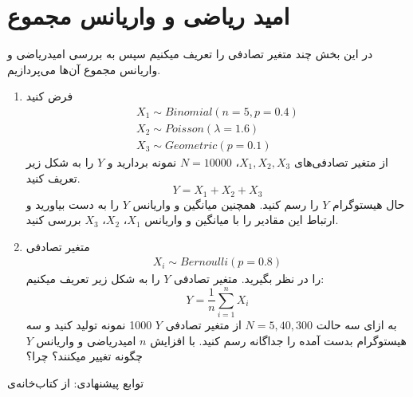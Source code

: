 \documentclass[a4paper]{article}
\begin{document}
\section{امید ریاضی و واریانس مجموع}
در این بخش چند متغیر تصادفی را تعریف میکنیم سپس به بررسی امیدریاضی و واریانس مجموع آن‌ها می‌پردازیم.
\begin{enumerate}
	\item

فرض کنید
\begin{gather*}
	X_{1} \sim Binomial(n=5,p=0.4) 
	\\
	X_{2} \sim Poisson(\lambda=1.6)
	\\
	X_{3} \sim Geometric(p=0.1)
\end{gather*}
از متغیر تصادفی‌های 
$ 	X_{1},X_{2},X_{3} $،
$ N = 10000 $
نمونه بردارید و $ Y $ را به شکل زیر تعریف کنید.
\begin{equation*}
	Y = X_{1}+X_{2}+X_{3}
\end{equation*} 
حال هیستوگرام $ Y $ را رسم کنید. همچنین میانگین و واریانس $ Y $ را به دست بیاورید و ارتباط این مقادیر را با میانگین و واریانس
$ X_{1} $،
$ X_{2} $، 
$ X_{3} $
بررسی کنید.
	\item
متغیر تصادفی 
\begin{gather*}
	X_i \sim Bernoulli(p = 0.8)
\end{gather*}
را در نظر بگیرید. متغیر تصادفی $Y$ را به شکل زیر تعریف میکنیم:
\begin{equation*}
	Y = \frac{1}{n} \sum_{i=1}^{n} X_i
\end{equation*}
به ازای سه حالت
$ N = 5, 40, 300 $
از متغیر تصادفی
$Y$
1000 نمونه تولید کنید و سه هیستوگرام بدست آمده را جداگانه رسم کنید. با افزایش
$n$
امیدریاضی و واریانس
$Y$
چگونه تغییر میکنند؟ چرا؟
\\
\end{enumerate}
توابع پیشنهادی:
از کتاب‌خانه‌ی 
\end{document}
